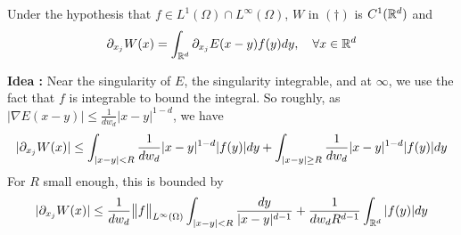 \documentclass[12pt,a4paper]{article}
\newenvironment{proof}
{\begin{changemargin}{0.5cm}{0.5cm} 
	}%
	{\end{changemargin}
}
\newenvironment{p}
{\begin{proof} 
	}%
	{\end{proof}
}
\begin{document}
 Under the hypothesis that $f\in L^1(\Omega) \cap L^{\infty}(\Omega)$, $W$ in $(\dagger)$ is $C^1(\mathbb{R}^d)$ and
\begin{align*}
\partial_{x_j} W(x) = \int_{\mathbb{R}^d} \partial_{x_j} E(x-y) f(y) dy, \quad \forall x\in \mathbb{R}^d
\end{align*}
\begin{p}
\textbf{Idea :} Near the singularity of $E$, the singularity integrable, and at $\infty$, we use the fact that $f$ is integrable to bound the integral. So roughly, as $|\nabla E(x-y)| \leq \frac{1}{dw_d} |x-y|^{1-d}$, we have
\begin{align*}
|\partial_{x_j} W(x)| \leq \int_{|x-y|<R} \frac{1}{dw_d} |x-y|^{1-d} |f(y)| dy + \int_{|x-y|\geq R} \frac{1}{dw_d} |x-y|^{1-d} |f(y)|dy
\end{align*}
For $R$ small enough, this is bounded by
\begin{align*}
|\partial_{x_j} W(x)| \leq \frac{1}{dw_d} \bigl\lVert f\bigr\rVert_{L^{\infty}(\Omega)} \int_{|x-y|< R} \frac{dy}{|x-y|^{d-1}} + \frac{1}{dw_d R^{d-1}} \int_{\mathbb{R}^{d}} |f(y)| dy
\end{align*}



\end{p}
\end{document}
